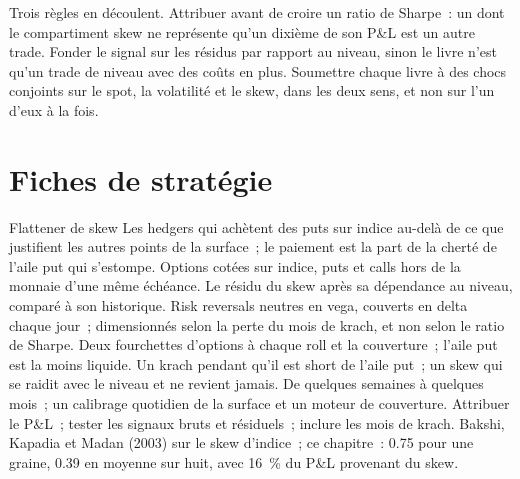Trois règles en découlent. Attribuer avant de croire un ratio de Sharpe~: un  dont le compartiment skew ne représente qu'un dixième de son P\&L est un autre trade. Fonder le signal sur
les résidus par rapport au niveau, sinon le livre n'est qu'un trade de niveau avec des coûts en plus. Soumettre chaque livre à des chocs conjoints sur le spot, la volatilité et le skew, dans les deux sens, et non sur
l'un d'eux à la fois.

\section{Fiches de stratégie}

\begin{strategyfile}{Flattener de skew}\label{strat:s2:skew-and-term-structure-relative-value:skew}
 Les hedgers qui achètent des puts sur indice au-delà de ce que justifient les autres points de la surface~; le paiement est la part de la cherté de l'aile put
qui s'estompe.
 Options cotées sur indice, puts et calls hors de la monnaie d'une même échéance.
 Le résidu du skew après sa dépendance au niveau, comparé à son historique.
 Risk reversals neutres en vega, couverts en delta chaque jour~; dimensionnés selon la perte du mois de krach, et non selon le ratio de Sharpe.
 Deux fourchettes d'options à chaque roll et la couverture~; l'aile put est la moins liquide.
 Un krach pendant qu'il est short de l'aile put~; un skew qui se raidit avec le niveau et ne revient jamais.
 De quelques semaines à quelques mois~; un calibrage quotidien de la surface et un moteur de couverture.
 Attribuer le P\&L~; tester les signaux bruts et résiduels~; inclure les mois de krach.
 Bakshi, Kapadia et Madan (2003) sur le skew d'indice~; ce chapitre~: 0.75 pour une graine, 0.39 en moyenne sur huit, avec 16~\% du P\&L
provenant du skew.
\end{strategyfile}

